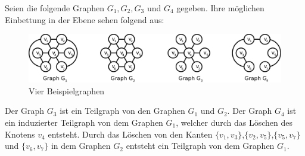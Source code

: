 \begin{bsp}
Seien die folgende Graphen $G_1,G_2,G_3$ und $G_4$ gegeben. Ihre möglichen Einbettung in der Ebene sehen folgend aus:
\begin{figure}[h!]
		\centering 		 
   \includegraphics[width=430pt]{bilder/bsp2.pdf}
	\caption{Vier Beispielgraphen}
  	 \end{figure}
  	 
Der Graph $G_3$ ist ein Teilgraph von den Graphen $G_1$ und $G_2$. Der Graph $G_4$ ist ein induzierter Teilgraph von dem Graphen $G_1$, welcher durch das Löschen des Knotens $v_4$ entsteht. Durch das Löschen von den Kanten $\{v_1,v_3\}$,$\{v_2,v_5\}$,$\{v_5,v_7\}$ und $\{v_6,v_7\}$ in dem Graphen $G_2$ entsteht ein Teilgraph von dem Graphen $G_1$.
\end{bsp}


